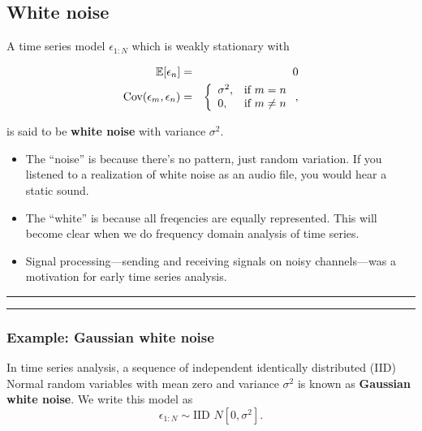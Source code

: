 \documentclass[]{article}
\newcommand{\cov}{\text{Cov}}
\begin{document}
\subsection{White noise}\label{white-noise}

A time series model \(\epsilon_{1:N}\) which is weakly stationary with

\begin{eqnarray}
\E[\epsilon_n]&=& 0 \\
\cov(\epsilon_m,\epsilon_n) &=& \left\{\begin{array}{ll}
  \sigma^2, & \mbox{if $m=n$} \\
   0, & \mbox{if $m\neq n$} \end{array}\right. ,
\end{eqnarray}

is said to be \textbf{white noise} with variance \(\sigma^2\).

\begin{itemize}
\item
  The ``noise'' is because there's no pattern, just random variation. If
  you listened to a realization of white noise as an audio file, you
  would hear a static sound.
\item
  The ``white'' is because all freqencies are equally represented. This
  will become clear when we do frequency domain analysis of time series.
\item
  Signal processing---sending and receiving signals on noisy
  channels---was a motivation for early time series analysis.
\end{itemize}

\begin{center}\rule{0.5\linewidth}{\linethickness}\end{center}

\begin{center}\rule{0.5\linewidth}{\linethickness}\end{center}

\subsubsection{Example: Gaussian white
noise}\label{example-gaussian-white-noise}

In time series analysis, a sequence of independent identically
distributed (IID) Normal random variables with mean zero and variance
\(\sigma^2\) is known as \textbf{Gaussian white noise}. We write this
model as \[ \epsilon_{1:N} \sim \mbox{IID } N[0,\sigma^2].\]
\end{document}
